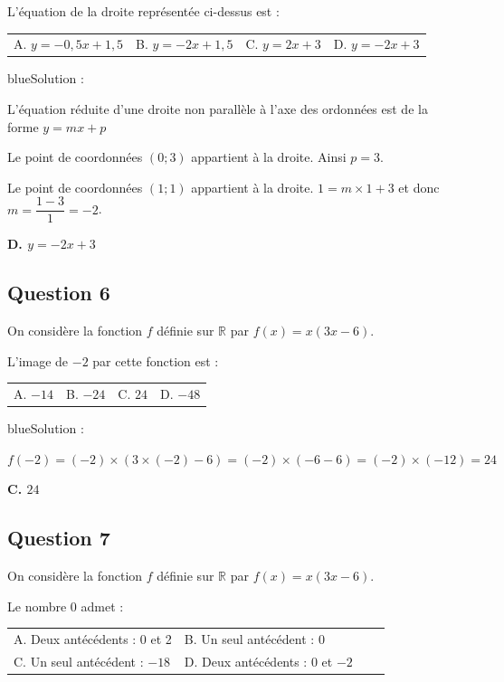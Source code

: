 L'équation de la droite représentée ci-dessus est :
\begin{center}
\begin{tabularx}{.92\linewidth}{XXXX} A. $y=-0,5x+1,5$ & B. $y=-2x+1,5$ & C. $y=2x+3$ & D. $y=-2x+3$\end{tabularx}
\end{center}

\begin{color}{blue}Solution :\par
L'équation réduite d'une droite non parallèle à l'axe des ordonnées est de la forme $y=mx+p$

Le point de coordonnées $(0;3)$ appartient à la droite. Ainsi $p=3$.

Le point de coordonnées $(1;1)$ appartient à la droite. $1 = m\times 1 + 3$ et donc $m=\dfrac{1-3}{1} = -2$.

\textbf{D. $y=-2x+3$}
\end{color}

\subsection*{Question 6}

On considère la fonction $f$ définie sur $\mathbb{R}$ par $f(x)=x(3x-6)$.\par
L'image de $-2$ par cette fonction est :
\begin{center}
\begin{tabularx}{.92\linewidth}{XXXX} A. $-14$ & B. $-24$ & C. $24$ & D. $-48$\end{tabularx}
\end{center}

\begin{color}{blue}Solution :\par
$f(-2)=(-2)\times(3\times(-2)-6) = (-2)\times(-6-6) =(-2)\times(-12) = 24 $

\textbf{C. $24$}
\end{color}

\subsection*{Question 7}

On considère la fonction $f$ définie sur $\mathbb{R}$ par $f(x)=x(3x-6)$.\par
Le nombre 0 admet :
\begin{center}
\begin{tabularx}{.92\linewidth}{XXXX} A. Deux antécédents : 0 et 2 & B. Un seul antécédent : 0 \\ C. Un seul antécédent : $-18$ & D. Deux antécédents : 0 et $-2$\end{tabularx}
\end{center}

